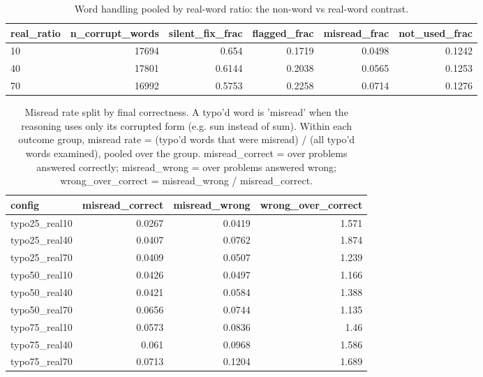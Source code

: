 \documentclass[11pt]{article}
\begin{document}
\begin{table}[H]
\centering
\caption{Word handling pooled by real-word ratio: the non-word vs real-word contrast.}
\small
\begin{adjustbox}{max width=\textwidth}
\begin{tabular}{lrrrrr}
\toprule
\textbf{real\_ratio} & \textbf{n\_corrupt\_words} & \textbf{silent\_fix\_frac} & \textbf{flagged\_frac} & \textbf{misread\_frac} & \textbf{not\_used\_frac} \\
\midrule
10 & 17694 & 0.654 & 0.1719 & 0.0498 & 0.1242 \\
40 & 17801 & 0.6144 & 0.2038 & 0.0565 & 0.1253 \\
70 & 16992 & 0.5753 & 0.2258 & 0.0714 & 0.1276 \\
\bottomrule
\end{tabular}
\end{adjustbox}
\end{table}

\begin{table}[H]
\centering
\caption{Misread rate split by final correctness. A typo'd word is 'misread' when the reasoning uses only its corrupted form (e.g. sun instead of sum). Within each outcome group, misread rate = (typo'd words that were misread) / (all typo'd words examined), pooled over the group. misread\_correct = over problems answered correctly; misread\_wrong = over problems answered wrong; wrong\_over\_correct = misread\_wrong / misread\_correct.}
\small
\begin{adjustbox}{max width=\textwidth}
\begin{tabular}{lrrr}
\toprule
\textbf{config} & \textbf{misread\_correct} & \textbf{misread\_wrong} & \textbf{wrong\_over\_correct} \\
\midrule
typo25\_real10 & 0.0267 & 0.0419 & 1.571 \\
typo25\_real40 & 0.0407 & 0.0762 & 1.874 \\
typo25\_real70 & 0.0409 & 0.0507 & 1.239 \\
typo50\_real10 & 0.0426 & 0.0497 & 1.166 \\
typo50\_real40 & 0.0421 & 0.0584 & 1.388 \\
typo50\_real70 & 0.0656 & 0.0744 & 1.135 \\
typo75\_real10 & 0.0573 & 0.0836 & 1.46 \\
typo75\_real40 & 0.061 & 0.0968 & 1.586 \\
typo75\_real70 & 0.0713 & 0.1204 & 1.689 \\
\bottomrule
\end{tabular}
\end{adjustbox}
\end{table}
\end{document}
